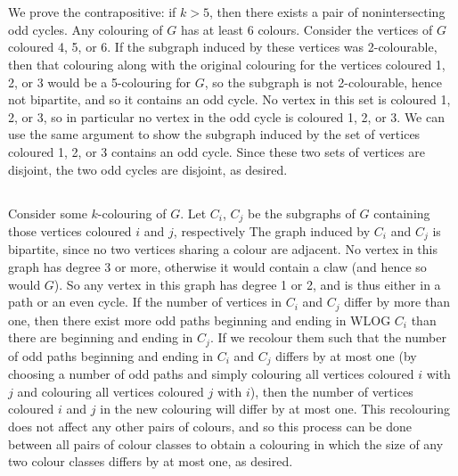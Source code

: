 \documentclass[11pt]{article}
\begin{document}
\section{} %
\subsection{} %
We prove the contrapositive: if $k>5$, then there exists a pair of
nonintersecting odd cycles. Any colouring of $G$ has at least 6 colours.
Consider the vertices of $G$ coloured 4, 5, or 6. If the subgraph induced by
these vertices was 2-colourable, then that colouring along with the original
colouring for the vertices coloured 1, 2, or 3 would be a 5-colouring for $G$,
so the subgraph is not 2-colourable, hence not bipartite, and so it contains
an odd cycle. No vertex in this set is coloured 1, 2, or 3, so in particular
no vertex in the odd cycle is coloured 1, 2, or 3. We can use the same
argument to show the subgraph induced by the set of vertices coloured 1, 2, or
3 contains an odd cycle. Since these two sets of vertices are disjoint, the
two odd cycles are disjoint, as desired.


\subsection{} %
Consider some $k$-colouring of $G$. Let $C_i$, $C_j$ be the subgraphs of $G$
containing those vertices coloured $i$ and $j$, respectively The graph induced
by $C_i$ and $C_j$ is bipartite, since no two vertices sharing a colour are
adjacent. No vertex in this graph has degree $3$ or more, otherwise it would
contain a claw (and hence so would $G$). So any vertex in this graph has
degree 1 or 2, and is thus either in a path or an even cycle. If
the number of vertices in $C_i$ and $C_j$ differ by more than one, then there
exist more odd paths beginning and ending in WLOG $C_i$ than there are
beginning and ending in $C_j$. If we recolour them such that the number of odd
paths beginning and ending in $C_i$ and $C_j$ differs by at most one (by
choosing a number of odd paths and simply colouring all vertices coloured $i$
with $j$ and colouring all vertices coloured $j$ with $i$), then the number of
vertices coloured $i$ and $j$ in the new colouring will differ by at most one.
This recolouring does not affect any other pairs of colours, and so this
process can be done between all pairs of colour classes to obtain a colouring
in which the size of any two colour classes differs by at most one, as desired.
\end{document}
